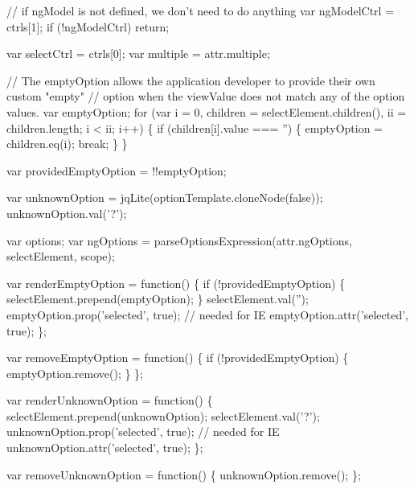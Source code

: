 \begin{DoxyCodeInclude}
{{{      \textcolor{comment}{// if ngModel is not defined, we don't need to do anything}
      var ngModelCtrl = ctrls[1];
      \textcolor{keywordflow}{if} (!ngModelCtrl) \textcolor{keywordflow}{return};

      var selectCtrl = ctrls[0];
      var multiple = attr.multiple;

      \textcolor{comment}{// The emptyOption allows the application developer to provide their own custom "empty"}
      \textcolor{comment}{// option when the viewValue does not match any of the option values.}
      var emptyOption;
      \textcolor{keywordflow}{for} (var i = 0, children = selectElement.children(), ii = children.length; i < ii; i++) \{
        \textcolor{keywordflow}{if} (children[i].value === \textcolor{stringliteral}{''}) \{
          emptyOption = children.eq(i);
          \textcolor{keywordflow}{break};
        \}
      \}

      var providedEmptyOption = !!emptyOption;

      var unknownOption = jqLite(optionTemplate.cloneNode(\textcolor{keyword}{false}));
      unknownOption.val(\textcolor{charliteral}{'?'});

      var options;
      var ngOptions = parseOptionsExpression(attr.ngOptions, selectElement, scope);


      var renderEmptyOption = \textcolor{keyword}{function}() \{
        \textcolor{keywordflow}{if} (!providedEmptyOption) \{
          selectElement.prepend(emptyOption);
        \}
        selectElement.val(\textcolor{stringliteral}{''});
        emptyOption.prop(\textcolor{stringliteral}{'selected'}, \textcolor{keyword}{true}); \textcolor{comment}{// needed for IE}
        emptyOption.attr(\textcolor{stringliteral}{'selected'}, \textcolor{keyword}{true});
      \};

      var removeEmptyOption = \textcolor{keyword}{function}() \{
        \textcolor{keywordflow}{if} (!providedEmptyOption) \{
          emptyOption.remove();
        \}
      \};


      var renderUnknownOption = \textcolor{keyword}{function}() \{
        selectElement.prepend(unknownOption);
        selectElement.val(\textcolor{charliteral}{'?'});
        unknownOption.prop(\textcolor{stringliteral}{'selected'}, \textcolor{keyword}{true}); \textcolor{comment}{// needed for IE}
        unknownOption.attr(\textcolor{stringliteral}{'selected'}, \textcolor{keyword}{true});
      \};

      var removeUnknownOption = \textcolor{keyword}{function}() \{
        unknownOption.remove();
      \};


}}}
\end{DoxyCodeInclude}
